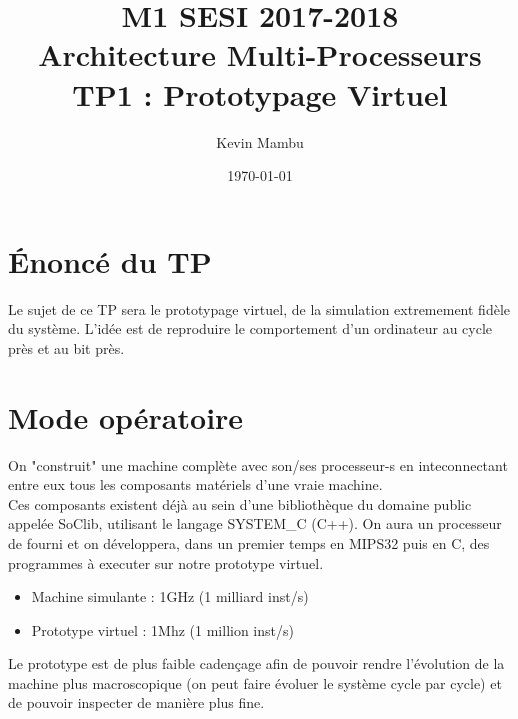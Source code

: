 \documentclass[10pt]{article}
\author{Kevin Mambu}
\date{\today}
\title{M1 SESI 2017-2018\\Architecture Multi-Processeurs\\TP1 : Prototypage Virtuel}
\begin{document}
\maketitle

\newpage
\tableofcontents

\newpage

\section{Énoncé du TP}
Le sujet de ce TP sera le prototypage virtuel, de la simulation extremement fidèle
du système.
L'idée est de reproduire le comportement d'un ordinateur au cycle près et au bit près.

\section{Mode opératoire}
On "construit" une machine complète avec son/ses processeur-s en inteconnectant
entre eux tous les composants matériels d'une vraie machine. \\
Ces composants existent déjà au sein d'une bibliothèque du domaine public appelée
SoClib, utilisant le langage SYSTEM_C (C++). On aura un processeur de fourni et on
développera, dans un premier temps en MIPS32 puis en C, des programmes à executer
sur notre prototype virtuel.\\

\begin{itemize}
  \item Machine simulante : 1GHz (1 milliard inst/s)
  \item Prototype virtuel : 1Mhz (1 million inst/s)
\end{itemize}

Le prototype est de plus faible cadençage afin de pouvoir rendre l'évolution de la
machine plus macroscopique (on peut faire évoluer le système cycle par cycle) et de
pouvoir inspecter de manière plus fine.
\end{document}
